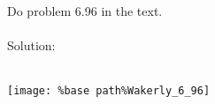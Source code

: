 Do problem 6.96 in the text.\\ \\

Solution: \\ \\
\begin{center}
  \texttt{[image: \%base path\%Wakerly\_6\_96]}
\end{center}
